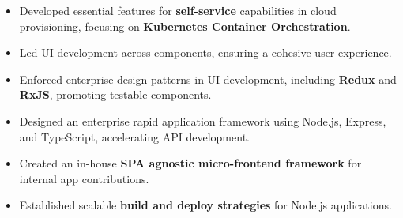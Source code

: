 \begin{itemize}
    \item Developed essential features for \textbf{self-service} capabilities in cloud provisioning, focusing on \textbf{Kubernetes Container Orchestration}.
    \item Led UI development across components, ensuring a cohesive user experience.
    \item Enforced enterprise design patterns in UI development, including \textbf{Redux} and \textbf{RxJS}, promoting testable components.
    \item Designed an enterprise rapid application framework using Node.js, Express, and TypeScript, accelerating API development.
    \item Created an in-house \textbf{SPA agnostic micro-frontend framework} for internal app contributions.
    \item Established scalable \textbf{build and deploy strategies} for Node.js applications.
\end{itemize}
